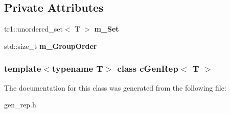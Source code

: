 \subsection*{\-Private \-Attributes}
\begin{DoxyCompactItemize}
\item 
\hypertarget{classcGenRep_af17e2ed953897003c229919293f6ecad}{tr1\-::unordered\-\_\-set$<$ \-T $>$ {\bfseries m\-\_\-\-Set}}\label{classcGenRep_af17e2ed953897003c229919293f6ecad}

\item 
\hypertarget{classcGenRep_aa7a645384a9a6036b4d860404557b88f}{std\-::size\-\_\-t {\bfseries m\-\_\-\-Group\-Order}}\label{classcGenRep_aa7a645384a9a6036b4d860404557b88f}

\end{DoxyCompactItemize}
\subsubsection*{template$<$typename T$>$ class c\-Gen\-Rep$<$ T $>$}



\-The documentation for this class was generated from the following file\-:\begin{DoxyCompactItemize}
\item 
gen\-\_\-rep.\-h\end{DoxyCompactItemize}
